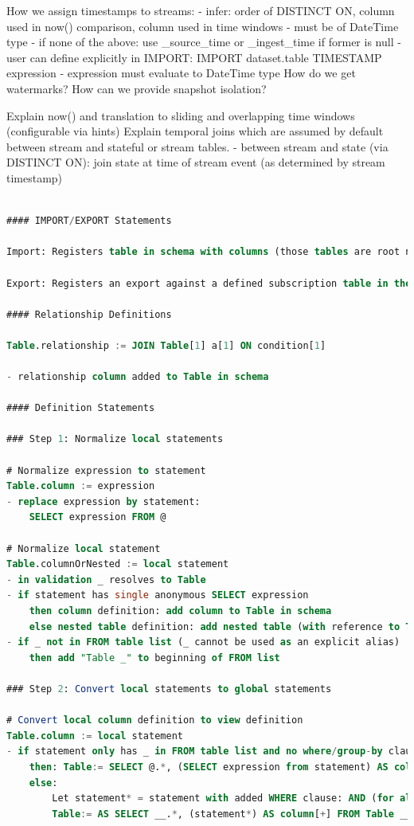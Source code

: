 \documentclass[	DIV=calc,%
							paper=letter,%
							fontsize=11pt,%
							twocolumn]{scrartcl}	 					%
\begin{document}
How we assign timestamps to streams:
    - infer: order of DISTINCT ON, column used in now() comparison, column used in time windows
        - must be of DateTime type
    - if none of the above: use \_source\_time or \_ingest\_time if former is null
    - user can define explicitly in IMPORT: IMPORT dataset.table TIMESTAMP expression
        - expression must evaluate to DateTime type
How do we get watermarks?
How can we provide snapshot isolation?

Explain now() and translation to sliding and overlapping time windows (configurable via hints)
Explain temporal joins which are assumed by default between stream and stateful or stream tables.
    - between stream and state (via DISTINCT ON): join state at time of stream event (as determined by stream timestamp)


\begin{lstlisting}[language=SQL]

#### IMPORT/EXPORT Statements

Import: Registers table in schema with columns (those tables are root nodes in the logical plan DAG)

Export: Registers an export against a defined subscription table in the schema

#### Relationship Definitions

Table.relationship := JOIN Table[1] a[1] ON condition[1]

- relationship column added to Table in schema

#### Definition Statements

### Step 1: Normalize local statements

# Normalize expression to statement
Table.column := expression
- replace expression by statement:
    SELECT expression FROM @

# Normalize local statement
Table.columnOrNested := local statement
- in validation _ resolves to Table
- if statement has single anonymous SELECT expression
    then column definition: add column to Table in schema
    else nested table definition: add nested table (with reference to Table) to schema with parent and child relationship columns and PK = Table PK + local PK for nested table (see below)
- if _ not in FROM table list (_ cannot be used as an explicit alias)
    then add "Table _" to beginning of FROM list

### Step 2: Convert local statements to global statements

# Convert local column definition to view definition
Table.column := local statement
- if statement only has _ in FROM table list and no where/group-by clause
    then: Table:= SELECT @.*, (SELECT expression from statement) AS column[+] FROM Table _
    else:
        Let statement* = statement with added WHERE clause: AND (for all PK columns pk of Table: @.pk = __.pk)
        Table:= AS SELECT __.*, (statement*) AS column[+] FROM Table __


\end{lstlisting}
\end{document}
